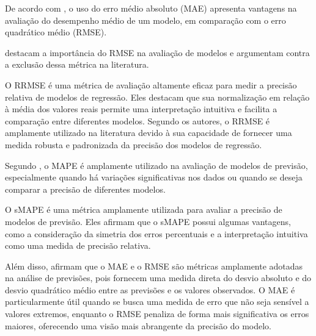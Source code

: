De acordo com , o uso do erro médio absoluto (MAE) apresenta vantagens na avaliação do desempenho médio de um modelo, em comparação com o erro quadrático médio (RMSE).

 destacam a importância do RMSE na avaliação de modelos e argumentam contra a exclusão dessa métrica na literatura.


\begin{quoting}[rightmargin=0cm,leftmargin=4cm]
	\begin{singlespace}
		{\footnotesize \noindent O RRMSE é uma métrica de avaliação altamente eficaz para medir a precisão relativa de modelos de regressão. Eles destacam que sua normalização em relação à média dos valores reais permite uma interpretação intuitiva e facilita a comparação entre diferentes modelos. Segundo os autores, o RRMSE é amplamente utilizado na literatura devido à sua capacidade de fornecer uma medida robusta e padronizada da precisão dos modelos de regressão. \cite{lopes2020evaluation} }
	\end{singlespace}
\end{quoting}


Segundo , o MAPE é amplamente utilizado na avaliação de modelos de previsão, especialmente quando há variações significativas nos dados ou quando se deseja comparar a precisão de diferentes modelos.

\begin{quoting}[rightmargin=0cm,leftmargin=4cm]
	\begin{singlespace}
		{\footnotesize \noindent  O sMAPE é uma métrica amplamente utilizada para avaliar a precisão de modelos de previsão. Eles afirmam que o sMAPE possui algumas vantagens, como a consideração da simetria dos erros percentuais e a interpretação intuitiva como uma medida de precisão relativa.\cite{nguyen2020toxicological} }
	\end{singlespace}
\end{quoting}

Além disso,  afirmam que o MAE e o RMSE são métricas amplamente adotadas na análise de previsões, pois fornecem uma medida direta do desvio absoluto e do desvio quadrático médio entre as previsões e os valores observados. O MAE é particularmente útil quando se busca uma medida de erro que não seja sensível a valores extremos, enquanto o RMSE penaliza de forma mais significativa os erros maiores, oferecendo uma visão mais abrangente da precisão do modelo.

